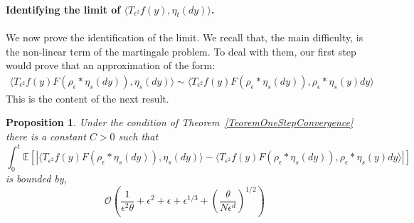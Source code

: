 \documentclass[12pt]{article}
\newtheorem{proposition}[theorem]{Proposition}
\newcommand{\IE}{\mathbb E}
\begin{document}
\paragraph{Identifying the limit of $\langle T_{\epsilon^2} f(y), \eta_t (dy) \rangle$.}
We now prove the identification of the limit. We recall that, the main difficulty, is the non-linear term of the martingale problem. To deal with them, our first step would prove that an approximation of the form:
\begin{align*}
\langle T_{\epsilon^2} f(y) F(\rho_\epsilon *\eta_s(dy)), \eta_s(dy) \rangle \sim \langle T_{\epsilon^2} f(y) F(\rho_\epsilon * \eta_s(dy)), \rho_\epsilon * \eta_s(y) dy \rangle
\end{align*}
This is the content of the next result.
\begin{proposition} \label{CuadraticApprox}
Under the condition of Theorem~\ref{TeoremOneStepConvergence} there is a constant $C>0$ such that
\begin{equation*}
\int_0^t \IE[|\langle T_{\epsilon^2} f(y) F(\rho_\epsilon *\eta_s(dy)), \eta_s(dy) \rangle - \langle T_{\epsilon^2} f(y) F(\rho_\epsilon * \eta_s(dy)), \rho_\epsilon * \eta_s(y) dy \rangle|]
\end{equation*}
is bounded by,
\begin{equation*}
\mathcal{O}\left( \frac{1}{\epsilon^2 \theta} + \epsilon^2 + \epsilon + \epsilon^{1/3}  + \left( \frac{\theta}{N \epsilon^d} \right)^{1/2}\right)
\end{equation*}
\end{proposition}
\end{document}
